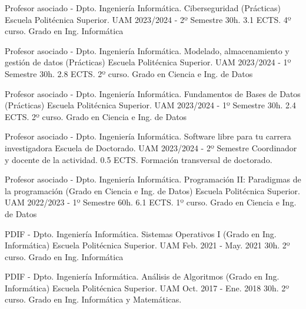 \begin{cventries}
  \cventry
	{Profesor asociado - Dpto. Ingeniería Informática.} %
	{Ciberseguridad (Prácticas)} %
	{Escuela Politécnica Superior. UAM} %
	{2023/2024 - 2º Semestre} %
	{30h. 3.1 ECTS. 4º curso. Grado en Ing. Informática}
	
  \cventry
	{Profesor asociado - Dpto. Ingeniería Informática.} %
	{Modelado, almacenamiento y gestión de datos (Prácticas)} %
	{Escuela Politécnica Superior. UAM} %
	{2023/2024 - 1º Semestre} %
	{30h. 2.8 ECTS. 2º curso. Grado en Ciencia e Ing. de Datos}
	
  \cventry
	{Profesor asociado - Dpto. Ingeniería Informática.} %
	{Fundamentos de Bases de Datos (Prácticas)} %
	{Escuela Politécnica Superior. UAM} %
	{2023/2024 - 1º Semestre} %
	{30h. 2.4 ECTS. 2º curso. Grado en Ciencia e Ing. de Datos}

  \cventry
	{Profesor asociado - Dpto. Ingeniería Informática.} %
	{Software libre para tu carrera investigadora} %
	{Escuela de Doctorado. UAM} %
	{2023/2024 - 2º Semestre} %
	{Coordinador y docente de la actividad. 0.5 ECTS. Formación transversal de doctorado.}

  \cventry
    {Profesor asociado - Dpto. Ingeniería Informática.} %
    {Programación II: Paradigmas de la programación (Grado en Ciencia e Ing. de Datos)} %
    {Escuela Politécnica Superior. UAM} %
    {2022/2023 - 1º Semestre} %
    {60h. 6.1 ECTS. 1º curso. Grado en Ciencia e Ing. de Datos}

  \cventry
    {PDIF - Dpto. Ingeniería Informática.} %
    {Sistemas Operativos I (Grado en Ing. Informática)} %
    {Escuela Politécnica Superior. UAM} %
    {Feb. 2021 - May. 2021} %
    {30h. 2º curso. Grado en Ing. Informática}


  \cventry
    {PDIF - Dpto. Ingeniería Informática.} %
    {Análisis de Algoritmos (Grado en Ing. Informática)} %
    {Escuela Politécnica Superior. UAM} %
    {Oct. 2017 - Ene. 2018} %
    {30h. 2º curso. Grado en Ing. Informática y Matemáticas.}
    

\end{cventries}
